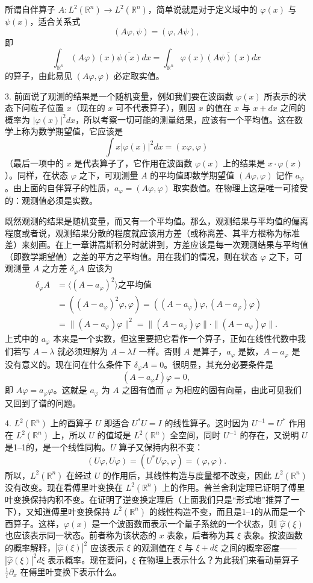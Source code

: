 所谓自伴算子 $A:L^2(\mathbb R^n)\to L^2(\mathbb R^n)$，简单说就是对于定义域中的 $\varphi(x)$ 与 $\psi(x)$，适合关系式
\[
 (A\varphi,\psi)=(\varphi,A\psi),
\]
即
\[
 \int_{\mathbb R^n}(A\varphi)(x)\overline{\psi(x)}dx
 =\int_{\mathbb R^n}\varphi(x)\overline{(A\psi)(x)}dx
\]
的算子，由此易见 $(A\varphi,\varphi)$ 必定取实值。

3. 前面说了观测的结果是一个随机变量，例如我们要在波函数 $\varphi(x)$ 所表示的状态下问粒子位置 $x$（现在的 $x$ 可不代表算子），则因 $x$ 的值在 $x$ 与 $x+dx$ 之间的概率为 $|\varphi(x)|^2dx$，所以考察一切可能的测量结果，应该有一个平均值。这在数学上称为数学期望值，它应该是
\[
 \int x|\varphi(x)|^2dx=(x\varphi,\varphi)
\]
（最后一项中的 $x$ 是代表算子了，它作用在波函数 $\varphi(x)$ 上的结果是 $x\cdot\varphi(x)$）。同样，在状态 $\varphi$ 之下，可观测量 $A$ 的平均值即数学期望值 $(A\varphi,\varphi)$ 记作 $a_\varphi$。由上面的自伴算子的性质，$a_\varphi=(A\varphi,\varphi)$ 取实数值。在物理上这是唯一可接受的：观测值必须是实数。

既然观测的结果是随机变量，而又有一个平均值。那么，观测结果与平均值的偏离程度或者说，观测结果分散的程度就应该用方差（或称离差、其平方根称为标准差）来刻画。在上一章讲高斯积分时就讲到，方差应该是每一次观测结果与平均值（即数学期望值）之差的平方之平均值。用在我们的情况，则在状态 $\varphi$ 之下，可观测量 $A$ 之方差 $\delta_\varphi A$ 应该为
\[
 \begin{aligned}
 \delta_\varphi A&=\langle(A-a_\varphi)^2\rangle\text{之平均值}\\
 &=((A-a_\varphi)^2\varphi,\varphi)=((A-a_\varphi)\varphi,(A-a_\varphi)\varphi)\\
 &=\|(A-a_\varphi)\varphi\|^2=\|(A-a_\varphi)\varphi\|\cdot\|(A-a_\varphi)\varphi\|.
 \end{aligned}
\]
上式中的 $a_\varphi$ 本来是一个实数，但这里要把它看作一个算子，正如在线性代数中我们若写 $A-\lambda$ 就必须理解为 $A-\lambda I$ 一样。否则 $A$ 是算子，$a_\varphi$ 是数，$A-a_\varphi$ 是没有意义的。现在问在什么条件下 $\delta_\varphi A=0$。很明显，其充分必要条件是
\[
 (A-a_\varphi I)\varphi=0,
\]
即 $A\varphi=a_\varphi\varphi$。这就是 $a_\varphi$ 为 $A$ 之固有值而 $\varphi$ 为相应的固有向量，由此可见我们又回到了谱的问题。

4. $L^2(\mathbb R^n)$ 上的酉算子 $U$ 即适合 $U^*U=I$ 的线性算子。这时因为 $U^{-1}=U^*$ 作用在 $L^2(\mathbb R^n)$ 上，所以 $U$ 的值域是 $L^2(\mathbb R^n)$ 全空间，同时 $U^{-1}$ 的存在，又说明 $U$ 是1--1的，是一个线性同构。$U$ 算子又保持内积不变：
\[
 (U\varphi,U\varphi)=(U^*U\varphi,\varphi)=(\varphi,\varphi).
\]
所以，$L^2(\mathbb R^n)$ 在经过 $U$ 的作用后，其线性构造与度量都不改变，因此 $L^2(\mathbb R^n)$ 没有改变。现在看傅里叶变换在 $L^2(\mathbb R^n)$ 上的作用。普兰舍利定理已证明了傅里叶变换保持内积不变。在证明了逆变换定理后（上面我们只是“形式地”推算了一下），又知道傅里叶变换保持 $L^2(\mathbb R^n)$ 的线性构造不变，而且是1--1的从而是一个酉算子。这样，$\varphi(x)$ 是一个波函数而表示一个量子系统的一个状态，则 $\widehat\varphi(\xi)$ 也应该表示同一状态。前者称为该状态的 $x$ 表象，后者称为其 $\xi$ 表象。按波函数的概率解释，$|\widehat\varphi(\xi)|^2$ 应该表示 $\xi$ 的观测值在 $\xi$ 与 $\xi+d\xi$ 之间的概率密度——$|\widehat\varphi(\xi)|^2d\xi$ 表示概率。现在要问，$\xi$ 在物理上表示什么？为此我们来看动量算子 $\frac1i\partial_x$ 在傅里叶变换下表示什么。

